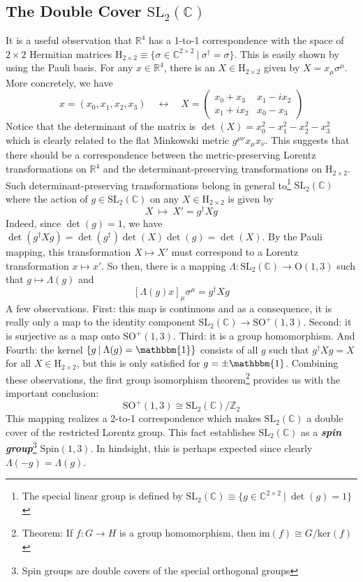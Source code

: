 \documentclass[onecolumn]{gwclass}
\renewcommand{\t}[1]{\text{#1}}
\begin{document}
\subsection{The Double Cover $\t{SL}_2\boldsymbol{(\mathbb{C})}$}
It is a useful observation that $\mathbb{R}^4$ has a 1-to-1 correspondence with the space of $2\times 2$ Hermitian matrices $\t{H}_{2\times 2}\equiv \{ \sigma \in \mathbb{C}^{2\times 2}\:|\: \sigma^\dagger = \sigma \}$. This is easily shown by using the Pauli basis. For any $x\in\mathbb{R}^4$, there is an $X\in \t{H}_{2\times 2}$ given by $X=x_\mu\sigma^\mu$. More concretely, we have
$$ x=(x_0, x_1, x_2, x_3) \quad\leftrightarrow\quad X=\begin{pmatrix}
	x_0 + x_3 & x_1 - ix_2 \\
	x_1 + i x_2 & x_0 - x_3
\end{pmatrix} $$
Notice that the determinant of the matrix is $\det(X)=x_0^2 - x_1^2 - x_2^2 - x_3^2$ which is clearly related to the flat Minkowski metric $g^{\mu\nu}x_\mu x_\nu$. This suggests that there should be a correspondence between the metric-preserving Lorentz transformations on $\mathbb{R}^4$ and the determinant-preserving transformations on $\t{H}_{2\times 2}$. Such determinant-preserving transformations belong in general to\footnote{The special linear group is defined by $\t{SL}_2(\mathbb{C}) \equiv \{ g\in\mathbb{C}^{2\times 2} \:|\: \det(g)=1\}$} $\t{SL}_2(\mathbb{C})$ where the action of $g\in\t{SL}_2(\mathbb{C})$ on any $X\in\t{H}_{2\times 2}$ is given by
$$X\:\mapsto\: X'=g^\dagger X g$$
Indeed, since $\det(g)=1$, we have $\det(g^\dagger X g) = \det(g^\dagger)\det(X)\det(g)=\det(X)$. By the Pauli mapping, this transformation $X\mapsto X'$ must correspond to a Lorentz transformation $x\mapsto x'$. So then, there is a mapping $\Lambda: \t{SL}_2(\mathbb{C})\to\t{O}(1,3)$ such that $g\mapsto \Lambda(g)$ and
$$    [\Lambda(g) x]_\mu \sigma^\mu  = g^\dagger X g$$
A few observations. First: this map is continuous and as a consequence, it is really only a map to the identity component $\t{SL}_2(\mathbb{C})\to\t{SO}^+(1,3)$. Second: it is surjective as a map onto $\t{SO}^+(1,3)$. Third: it is a group homomorphism. And Fourth: the kernel $\{g\:|\:\Lambda(g)=\mathbbm{1}\}$ consists of all $g$ such that $g^\dagger Xg = X$ for all $X\in\t{H}_{2\times 2}$, but this is only satisfied for $g=\pm\mathbbm{1}$. Combining these observations, the first group isomorphism theorem\footnote{Theorem: If $f:G\to H$ is a group homomorphism, then $\t{im}(f)\cong G/\t{ker}(f)$} provides us with the important conclusion:
$$  \t{SO}^+(1,3) \cong \t{SL}_2(\mathbb{C})/ \mathbb{Z}_2 $$
This mapping realizes a 2-to-1 correspondence which makes $\t{SL}_2(\mathbb{C})$ a double cover of the restricted Lorentz group. This fact establishes $\t{SL}_2(\mathbb{C})$ as a \textbf{\emph{spin group}}\footnote{Spin groups are double covers of the special orthogonal groups} $\t{Spin}(1,3)$. In hindsight, this is perhaps expected since clearly $\Lambda(-g)=\Lambda(g)$. 
\end{document}

